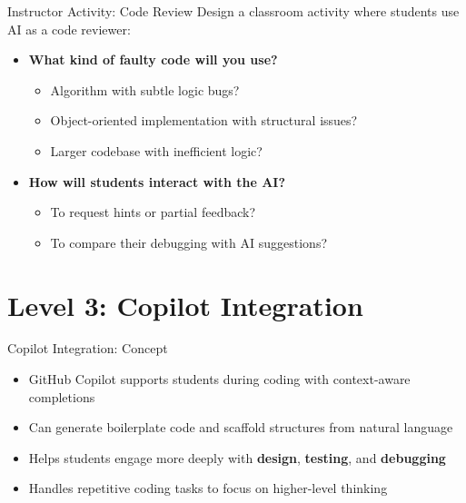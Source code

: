 \documentclass[xcolor={dvipsnames}, aspectratio=169]{beamer}
\begin{document}
\begin{frame}{Instructor Activity: Code Review}
  Design a classroom activity where students use AI as a code reviewer:
  
  \begin{itemize}
    \item \textbf{What kind of faulty code will you use?}
      \begin{itemize}
        \item Algorithm with subtle logic bugs?
        \item Object-oriented implementation with structural issues?
        \item Larger codebase with inefficient logic?
      \end{itemize}
    \item \textbf{How will students interact with the AI?}
      \begin{itemize}
        \item To request hints or partial feedback?
        \item To compare their debugging with AI suggestions?
      \end{itemize}
  \end{itemize}
\end{frame}

\section{Level 3: Copilot Integration}

\begin{frame}{Copilot Integration: Concept}
  \begin{itemize}
    \item GitHub Copilot supports students during coding with context-aware completions
    \item Can generate boilerplate code and scaffold structures from natural language
    \item Helps students engage more deeply with \textbf{design}, \textbf{testing}, and \textbf{debugging}
    \item Handles repetitive coding tasks to focus on higher-level thinking
  \end{itemize}
\end{frame}
\end{document}
